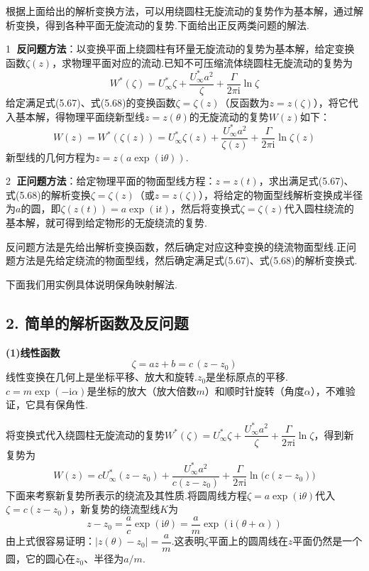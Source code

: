 根据上面给出的解析变换方法，可以用绕圆柱无旋流动的复势作为基本解，通过解析变换，得到各种平面无旋流动的复势.下面给出正反两类问题的解法.

\textcircled{1} \textbf{反问题方法}：以变换平面上绕圆柱有环量无旋流动的复势为基本解，给定变换函数$\zeta(z)$，求物理平面对应的流动.已知不可压缩流体绕圆柱无旋流动的复势为
\[
W^{*}(\zeta)=U_\infty^{*}\zeta+\frac{U_\infty^{*}a^{2}}{\zeta}+\frac{\Gamma}{2\pi\mathrm{i}}\ln\zeta
\]
给定满足式(5.67)、式(5.68)的变换函数$\zeta=\zeta(z)$（反函数为$z=z(\zeta)$），将它代入基本解，得物理平面绕新型线$z=z(\theta)$的无旋流动的复势$W(z)$如下：
\begin{equation*}
W(z)=W^{*}(\zeta(z))=U_\infty^{*}\zeta(z)+\frac{U_\infty^{*}a^{2}}{\zeta(z)}+\frac{\Gamma}{2\pi\mathrm{i}}\ln\zeta(z)
\tag{5.73}
\end{equation*}
新型线的几何方程为$z=z(a\exp(\mathrm{i}\theta))$.

\textcircled{2} \textbf{正问题方法}：给定物理平面的物面型线方程：$z=z(t)$，求出满足式(5.67)、式(5.68)的解析变换$\zeta=\zeta(z)$（或$z=z(\zeta)$），将给定的物面型线解析变换成半径为$a$的圆，即$\zeta(z(t))=a\exp(\mathrm{i}t)$，然后将变换式$\zeta=\zeta(z)$代入圆柱绕流的基本解，就可得到给定物形的无旋绕流的复势.

反问题方法是先给出解析变换函数，然后确定对应这种变换的绕流物面型线.正问题方法是先给定绕流的物面型线，然后确定满足式(5.67)、式(5.68)的解析变换式.

下面我们用实例具体说明保角映射解法.

\subsection*{2. 简单的解析函数及反问题}

\textbf{(1)线性函数}
\begin{equation*}
\zeta=az+b=c\,(z-z_0)
\tag{5.74}
\end{equation*}
线性变换在几何上是坐标平移、放大和旋转.$z_0$是坐标原点的平移.$c=m\exp(-\mathrm{i}\alpha)$是坐标的放大（放大倍数$m$）和顺时针旋转（角度$\alpha$），不难验证，它具有保角性.

将变换式代入绕圆柱无旋流动的复势$W^{*}(\zeta)=U_\infty^{*}\zeta+\dfrac{U_\infty^{*}a^{2}}{\zeta}+\dfrac{\Gamma}{2\pi\mathrm{i}}\ln\zeta$，得到新复势为
\begin{equation*}
W(z)=cU_\infty^{*}(z-z_0)+\frac{U_\infty^{*}a^{2}}{c(z-z_0)}+\frac{\Gamma}{2\pi\mathrm{i}}\ln\big(c(z-z_0)\big)
\tag{5.75a}
\end{equation*}
下面来考察新复势所表示的绕流及其性质.将圆周线方程$\zeta=a\exp(\mathrm{i}\theta)$代入$\zeta=c(z-z_0)$，新复势的绕流型线$K$为
\[
z-z_0=\frac{a}{c}\exp(\mathrm{i}\theta)=\frac{a}{m}\exp(\mathrm{i}(\theta+\alpha))
\]
由上式很容易证明：$|z(\theta)-z_0|=\dfrac{a}{m}$.这表明$\zeta$平面上的圆周线在$z$平面仍然是一个圆，它的圆心在$z_0$、半径为$a/m$.

